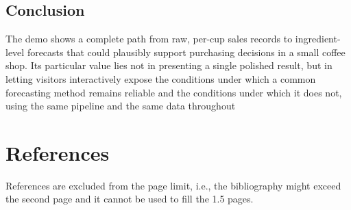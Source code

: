 \documentclass[conference]{IEEEtran}
\begin{document}
\subsection{Conclusion}
The demo shows a complete path from raw, per-cup sales records to ingredient-level forecasts that could plausibly support purchasing decisions in a small coffee shop. Its particular value lies not in presenting a single polished result, but in letting visitors interactively expose the conditions under which a common forecasting method remains reliable and the conditions under which it does not, using the same pipeline and the same data throughout

\section*{References}
References are excluded from the page limit, i.e., the bibliography might exceed the second page and it cannot be used to fill the 1.5 pages.
\end{document}
